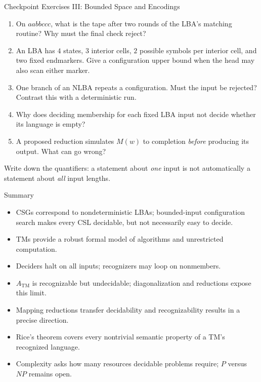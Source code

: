 \documentclass[10pt]{beamer}
\newcommand{\ATM}{A_{\mathrm{TM}}}
\begin{document}
\begin{frame}{Checkpoint Exercises III: Bounded Space and Encodings}
  \small
  \begin{enumerate}
    \item On $aabbccc$, what is the tape after two rounds of the LBA's
      matching routine? Why must the final check reject?
    \item An LBA has $4$ states, $3$ interior cells, $2$ possible symbols
      per interior cell, and two fixed endmarkers. Give a configuration
      upper bound when the head may also scan either marker.
    \item One branch of an NLBA repeats a configuration. Must the input
      be rejected? Contrast this with a deterministic run.
    \item Why does deciding membership for each fixed LBA input not decide
      whether its language is empty?
    \item A proposed reduction simulates $M(w)$ to completion \emph{before}
      producing its output. What can go wrong?
  \end{enumerate}
  Write down the quantifiers: a statement about \emph{one} input is not
  automatically a statement about \emph{all} input lengths.
\end{frame}

\begin{frame}{Summary}
  \small
  \begin{itemize}
    \item CSGs correspond to nondeterministic LBAs; bounded-input configuration
      search makes every CSL decidable, but not necessarily easy to decide.
    \item TMs provide a robust formal model of algorithms and unrestricted computation.
    \item Deciders halt on all inputs; recognizers may loop on nonmembers.
    \item $\ATM$ is recognizable but undecidable; diagonalization and reductions expose this limit.
    \item Mapping reductions transfer decidability and recognizability results in a precise direction.
    \item Rice's theorem covers every nontrivial semantic property of a TM's recognized language.
    \item Complexity asks how many resources decidable problems require; $P$ versus $NP$ remains open.
  \end{itemize}
\end{frame}
\end{document}
